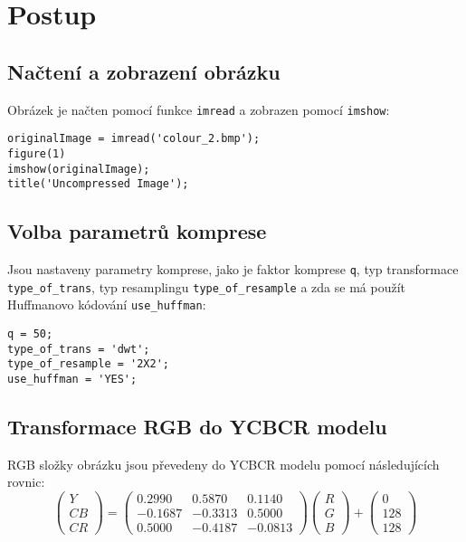 \section{Postup}

\subsection{Načtení a zobrazení obrázku}
Obrázek je načten pomocí funkce \texttt{imread} a zobrazen pomocí \texttt{imshow}:
\begin{verbatim}
originalImage = imread('colour_2.bmp');
figure(1)
imshow(originalImage);
title('Uncompressed Image');
\end{verbatim}

\subsection{Volba parametrů komprese}
Jsou nastaveny parametry komprese, jako je faktor komprese \texttt{q}, typ transformace \texttt{type\_of\_trans}, typ resamplingu \texttt{type\_of\_resample} a zda se má použít Huffmanovo kódování \texttt{use\_huffman}:
\begin{verbatim}
q = 50;
type_of_trans = 'dwt';
type_of_resample = '2X2';
use_huffman = 'YES';
\end{verbatim}

\subsection{Transformace RGB do YCBCR modelu}
RGB složky obrázku jsou převedeny do YCBCR modelu pomocí následujících rovnic\cite{pIDhmNtdwMgbcGoe}\cite{ygeiGeoinf2}:
\[
\begin{pmatrix}
Y \\
CB \\
CR
\end{pmatrix}
=
\begin{pmatrix}
0.2990 & 0.5870 & 0.1140 \\
-0.1687 & -0.3313 & 0.5000 \\
0.5000 & -0.4187 & -0.0813
\end{pmatrix}
\begin{pmatrix}
R \\
G \\
B
\end{pmatrix}
+
\begin{pmatrix}
0 \\
128 \\
128
\end{pmatrix}
\]


